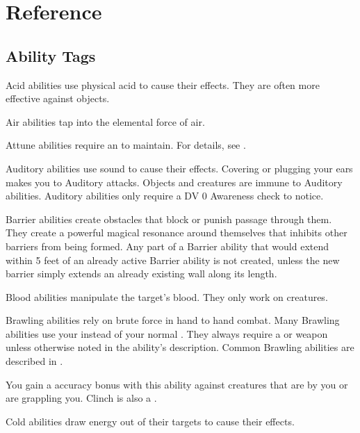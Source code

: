 \chapter{Reference}\label{Reference}

\section{Ability Tags}\label{Ability Tags}

   Acid abilities use physical acid to cause their effects.
  They are often more effective against objects.

   Air abilities tap into the elemental force of air.

   Attune abilities require an  to maintain.
  For details, see .

   Auditory abilities use sound to cause their effects.
  Covering or plugging your ears makes you \resistant to Auditory attacks.
  Objects and \deafened creatures are immune to Auditory abilities.
  Auditory abilities only require a DV 0 Awareness check to notice.

   Barrier abilities create obstacles that block or punish passage through them.
  They create a powerful magical resonance around themselves that inhibits other barriers from being formed.
  Any part of a Barrier ability that would extend within 5 feet of an already active Barrier ability is not created, unless the new barrier simply extends an already existing wall along its length.

   Blood abilities manipulate the target's blood.
  They only work on  creatures.

   Brawling abilities rely on brute force in hand to hand combat.
  Many Brawling abilities use your  instead of your normal .
  They always require a  or  weapon unless otherwise noted in the ability's description.
  Common Brawling abilities are described in .

   You gain a  accuracy bonus with this ability against creatures that are \grappled by you or are grappling you.
  Clinch is also a .

   Cold abilities draw energy out of their targets to cause their effects.

